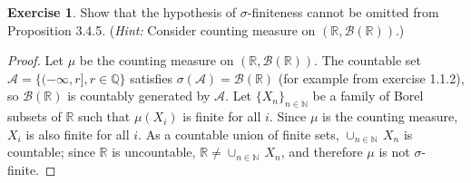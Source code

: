 \documentclass[11pt,a4paper,twoside]{article}
\theoremstyle{definition}
\newcounter{excounter}
\newtheorem{exercise}[excounter]{Exercise}
\begin{document}
\begin{exercise}

  Show that the hypothesis of $\sigma$-finiteness cannot be omitted from Proposition 3.4.5.
  (\emph{Hint:} Consider counting measure on $( \mathbb{R}, \mathscr{B} ( \mathbb{R} ) )$.)

\end{exercise}

\begin{proof}

  Let $\mu$ be the counting measure on $( \mathbb{R}, \mathscr{B} ( \mathbb{R} ) )$.
  The countable set $\mathscr{A} = \{ ( {-\infty}, r ], r \in \mathbb{Q} \}$ satisfies
  $\sigma ( \mathscr{A} ) = \mathscr{B} ( \mathbb{R} )$ (for example from exercise 1.1.2),
  so $\mathscr{B} ( \mathbb{R} )$ is countably generated by $\mathscr{A}$.
  Let $\{ X_n \}_{n \in \mathbb{N}}$ be a family of Borel subsets of $\mathbb{R}$ such that
  $\mu ( X_i )$ is finite for all $i$. Since $\mu$ is the counting measure, $X_i$ is
  also finite for all $i$. As a countable union of finite sets, $\cup_{n \in \mathbb{N}} \,X_n$
  is countable; since $\mathbb{R}$ is uncountable, $\mathbb{R} \neq \cup_{n \in \mathbb{N}} \,X_n$,
  and therefore $\mu$ is not $\sigma$-finite.


\end{proof}
\end{document}
